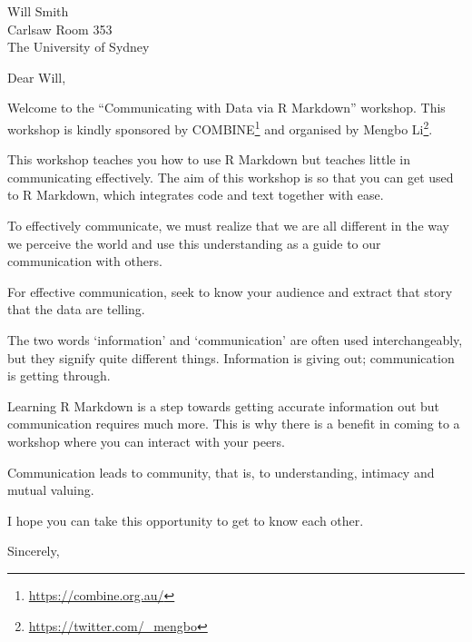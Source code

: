 \documentclass[11pt,]{letter}
\date{4th October 2019}
\renewcommand{\href}[2]{#2\footnote{\url{#1}}}
\renewenvironment{quote}{\begin{blockquote}\list{}{\rightmargin=0em\leftmargin=0em}%
\item\relax\color{greytext}\ignorespaces}{\unskip\unskip\endlist\end{blockquote}}
\begin{document}
\begin{letter}{Will Smith\\
Carlsaw Room 353\\
The University of Sydney\\}
\opening{Dear Will,}

Welcome to the ``Communicating with Data via R Markdown'' workshop. This
workshop is kindly sponsored by \href{https://combine.org.au/}{COMBINE}
and organised by \href{https://twitter.com/_mengbo}{Mengbo Li}.

This workshop teaches you how to use R Markdown but teaches little in
communicating effectively. The aim of this workshop is so that you can
get used to R Markdown, which integrates code and text together with
ease.

\begin{quote}
To effectively communicate, we must realize that we are all different in
the way we perceive the world and use this understanding as a guide to
our communication with others.
\end{quote}

For effective communication, seek to know your audience and extract that
story that the data are telling.

\begin{quote}
The two words `information' and `communication' are often used
interchangeably, but they signify quite different things. Information is
giving out; communication is getting through.
\end{quote}

Learning R Markdown is a step towards getting accurate information out
but communication requires much more. This is why there is a benefit in
coming to a workshop where you can interact with your peers.

\begin{quote}
Communication leads to community, that is, to understanding, intimacy
and mutual valuing.
\end{quote}

I hope you can take this opportunity to get to know each other.

\longindentation=0pt
\closing{Sincerely,}

\end{letter}
\end{document}
